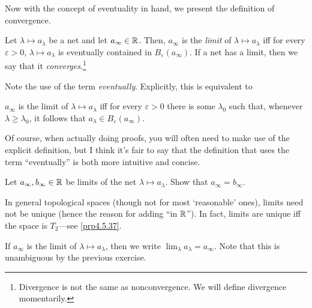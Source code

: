 Now with the concept of eventuality in hand, we present the definition of convergence.
\begin{dfn}\label{dfn3.3.8}
Let $\lambda \mapsto a_\lambda$ be a net and let $a_\infty\in \mathbb{R}$.  Then, $a_\infty$ is the \emph{limit} of $\lambda \mapsto a_\lambda$ iff for every $\varepsilon >0$, $\lambda \mapsto a_\lambda$ is eventually contained in $B_\varepsilon (a_\infty)$.   If a net has a limit, then we say that it \emph{converges}.\footnote{Divergence is not the same as nonconvergence.  We will define divergence momentarily.}
\begin{rmk}
Note the use of the term \emph{eventually}.  Explicitly, this is equivalent to
\begin{textequation}
$a_\infty$ is the limit of $\lambda \mapsto a_\lambda$ iff for every $\varepsilon >0$ there is some $\lambda _0$ such that, whenever $\lambda \geq \lambda _0$, it follows that $a_\lambda \in B_{\varepsilon}(a_\infty)$.
\end{textequation}
Of course, when actually doing proofs, you will often need to make use of the explicit definition, but I think it's fair to say that the definition that uses the term ``eventually'' is both more intuitive and concise.
\end{rmk}
\begin{exr}
Let $a_\infty,b_\infty\in \mathbb{R}$ be limits of the net $\lambda \mapsto a_\lambda$.  Show that $a_\infty=b_\infty$.
\begin{rmk}
In general topological spaces (though not for most `reasonable' ones), limits need not be unique (hence the reason for adding ``in $\mathbb{R}$'').  In fact, limits are unique iff the space is $T_2$---see \cref{prp4.5.37}.
\end{rmk}
\end{exr}
\begin{rmk}
If $a_\infty$ is the limit of $\lambda \mapsto a_\lambda$, then we write $\lim _\lambda a_\lambda =a_\infty$.  Note that this is unambiguous by the previous exercise.
\end{rmk}
\end{dfn}

